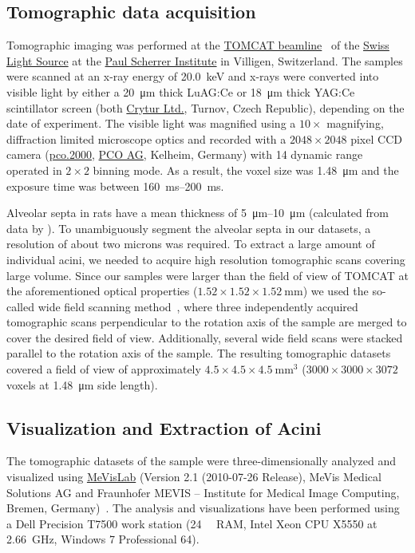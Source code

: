 \documentclass[final,paper=a4,DIV=calc,abstract,english]{scrartcl}
\begin{document}
\subsection{Tomographic data acquisition}
Tomographic imaging was performed at the \href{http://www.psi.ch/sls/tomcat/}{TOMCAT beamline}~\citep{Stampanoni2006a} of the \href{http://www.psi.ch/sls/}{Swiss Light Source} at the \href{http://www.psi.ch/}{Paul Scherrer Institute} in Villigen, Switzerland.
The samples were scanned at an x-ray energy of \SI{20.0}{\kilo\electronvolt} and x-rays were converted into visible light by either a \SI{20}{\micro\meter} thick LuAG:Ce or \SI{18}{\micro\meter} thick YAG:Ce scintillator screen (both \href{http://www.crytur.cz/}{Crytur Ltd.}, Turnov, Czech Republic), depending on the date of experiment.
The visible light was magnified using a \(10\times\) magnifying, diffraction limited microscope optics and recorded with a \(2048\times2048\) pixel CCD camera (\href{http://www.pco.de/sensitive-cameras/pco2000/}{pco.2000}, \href{http://www.pco.de/}{PCO AG}, Kelheim, Germany) with \SI{14}{\bit} dynamic range operated in \(2\times2\) binning mode.
As a result, the voxel size was \SI{1.48}{\micro\meter} and the exposure time was between \SIrange{160}{200}{\milli\second}.

Alveolar septa in rats have a mean thickness of \SIrange{5}{10}{\micro\meter} (calculated from data by \citet{Burri1974}).
To unambiguously segment the alveolar septa in our datasets, a resolution of about two microns was required.
To extract a large amount of individual acini, we needed to acquire high resolution tomographic scans covering large volume.
Since our samples were larger than the  field of view of TOMCAT at the aforementioned optical properties (\(1.52\times1.52\times\SI{1.52}{\milli\meter}\)) we used the so-called wide field scanning method~\citep{Haberthuer2010}, where three independently acquired tomographic scans perpendicular to the rotation axis of the sample are merged to cover the desired field of view.
Additionally, several wide field scans were stacked parallel to the rotation axis of the sample.
The resulting tomographic datasets covered a field of view of approximately \(4.5\times4.5\times\SI{4.5}{\milli\meter\cubed}\) (\(3000\times3000\times3072\) voxels at \SI{1.48}{\micro\meter} side length).

\subsection{Visualization and Extraction of Acini}
The tomographic datasets of the sample were three-dimensionally analyzed and visualized using \href{http://mevislab.de}{MeVisLab} (Version 2.1 (2010-07-26 Release), MeVis Medical Solutions AG and Fraunhofer MEVIS -- Institute for Medical Image Computing, Bremen, Germany)~\citep{Bitter2007}.
The analysis and visualizations have been performed using a Dell Precision T7500 work station (\SI{24}{\giga\byte} RAM, Intel Xeon CPU X5550 at \SI{2.66}{\giga\hertz}, Windows 7 Professional \SI{64}{\bit}).
\end{document}
